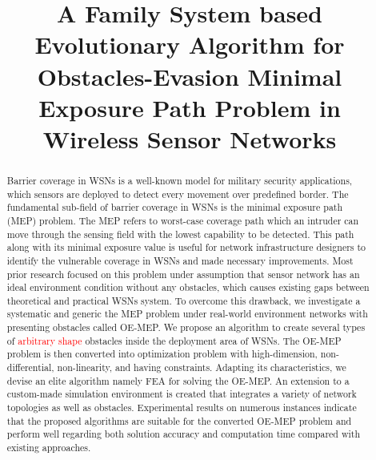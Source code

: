 \documentclass[final]{elsarticle}
\begin{document}
\begin{frontmatter}
\title{A Family System based Evolutionary Algorithm for Obstacles-Evasion Minimal Exposure Path Problem in Wireless Sensor Networks}


%
%
\begin{abstract}
Barrier coverage in WSNs is a well-known model for military security applications, which sensors are deployed to detect every movement over predefined border. The fundamental sub-field of barrier coverage in WSNs is the minimal exposure path (MEP) problem. The MEP refers to worst-case coverage path which an intruder can move through the sensing field with the lowest capability to be detected. This path along with its minimal exposure value is useful for network infrastructure designers to identify the vulnerable coverage in WSNs and made necessary improvements. Most prior research focused on this problem under assumption that sensor network has an ideal environment condition without any obstacles, which causes existing gaps between theoretical and practical WSNs system. To overcome this drawback, we investigate a systematic and generic the MEP problem under real-world environment networks with presenting obstacles called OE-MEP. We propose an algorithm to create several types of  \textcolor{red}{arbitrary shape} obstacles inside the deployment area of WSNs. The OE-MEP problem is then converted into optimization problem with high-dimension, non-differential, non-linearity, and having constraints. Adapting its characteristics, we devise an elite algorithm namely FEA for solving the OE-MEP. An extension to a custom-made simulation environment is created that integrates a variety of network topologies as well as obstacles. Experimental results on numerous instances indicate that the proposed algorithms are suitable for the converted OE-MEP problem and perform well regarding both solution accuracy and computation time compared with existing approaches.
  

\end{abstract}
\end{frontmatter}
\end{document}
